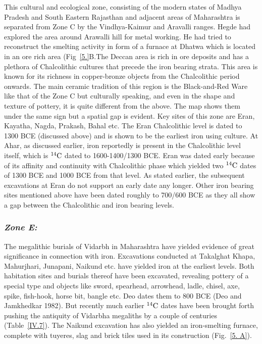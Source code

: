 This cultural and ecological zone, consisting of the modern states of Madhya Pradesh and South Eastern Rajasthan and adjacent areas of Maharashtra is separated from Zone C by the Vindhya-Kaimur and Aravalli ranges. Hegde had explored the area around Arawalli hill for metal working. He had tried to reconstruct the smelting activity in form of a furnace at Dhatwa which is located in an ore rich area (Fig~\ref{5.}B.The Deccan area is rich in ore deposits and has a plethora of Chalcolithic cultures that precede the iron bearing strata. This area is known for its richness in copper-bronze objects from the Chalcolithic period onwards. The main ceramic tradition of this region is the Black-and-Red Ware like that of the Zone C but culturally speaking, and even in the shape and texture of pottery, it is quite different from the above. The map shows them under the same sign but a spatial gap is evident. Key sites of this zone are Eran, Kayatha, Nagda, Prakash, Bahal etc. The Eran Chalcolithic level is dated to 1300 BCE (discussed above) and is shown to be the earliest iron using culture. At Ahar, as discussed earlier, iron reportedly is present in the Chalcolithic level itself, which is $^{14}{\rm C}$ dated to 1600-1400/1300 BCE.  Eran was dated early because of its affinity and continuity with Chalcolithic phase which yielded two $^{14}{\rm C}$ dates of 1300 BCE and 1000 BCE from that level. As stated earlier, the subsequent excavations at Eran do not support an early date any longer. Other iron bearing sites mentioned above have been dated roughly to 700/600 BCE as they all show a gap between the Chalcolithic and iron bearing levels.

\subsubsection*{\textit{Zone E:}}

The megalithic burials of Vidarbh in Maharashtra have yielded evidence of great significance in connection with iron. Excavations conducted at Takalghat ­Khapa, Mahurjhari, Junapani, Naikund etc. have yielded iron at the earliest levels. Both habitation sites and burials thereof have been excavated, revealing pottery of a special type and objects like sword, spearhead, arrowhead, ladle, chisel, axe, spike, fish-hook, horse bit, bangle etc. Deo dates them to 800 BCE (Deo and Jamkhedkar 1982). But recently much earlier $^{14}{\rm C}$ dates have been brought forth pushing the antiquity of Vidarbha megaliths by a couple of centuries (Table~\ref{IV.7}). The Naikund excavation has also yielded an iron-smelting furnace, complete with tuyeres, slag and brick tiles used in its construction (Fig.~\ref{5. A}).

